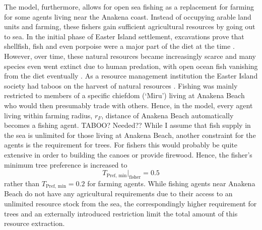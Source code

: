 The model, furthermore, allows for open sea fishing as a replacement for farming for some agents living near the Anakena coast.
Instead of occupying arable land units and farming, these fishers gain sufficient agricultural resources by going out to sea.
In the initial phase of Easter Island settlement, excavations prove that shellfish, fish and even porpoise were a major part of the diet at the time \citep{Bahn2017}.
However, over time, these natural resources became increasingly scarce and many species even went extinct due to human predation, with open ocean fish vanishing from the diet eventually \citep{Diamond2011}.
As a resource management institution the Easter Island society had taboos on the harvest of natural resources \citep{Good2006}. 
Fishing was mainly restricted to members of a specific chiefdom (`Miru') living at Anakena Beach \citep{Bahn2017} who would then presumably trade with others.
Hence, in the model, every agent living within farming radius, $r_F$, distance of Anakena Beach automatically becomes a fishing agent.
\TODO TABOO? Needed??
While I assume that fish supply in the sea is unlimited for those living at Anakena Beach, another constraint for the agents is the requirement for trees.
For fishers this would probably be quite extensive in order to building the canoes or provide firewood. 
Hence, the fisher's minimum tree preference is increased to
\begin{equation}
T_\text{Pref, min}|_\text{fisher} = 0.5
\end{equation} 
rather than $T_\text{Pref, min} = 0.2$ for farming agents.
While fishing agents near Anakena Beach do not have any agricultural requirements due to their access to an unlimited resource stock from the sea, the correspondingly higher requirement for trees and an externally introduced restriction limit the total amount of this resource extraction.

